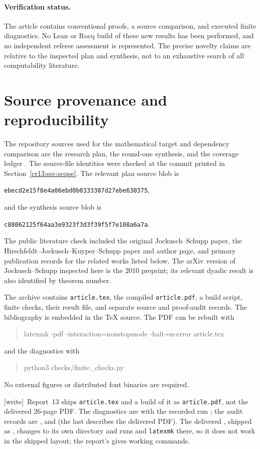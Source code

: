 \documentclass[11pt,letterpaper]{article}
\theoremstyle{definition}
\theoremstyle{remark}\newtheorem{remark}[theorem]{Remark}
\numberwithin{equation}{section}
\newcommand{\wtag}{\textup{[write]}}
\begin{document}
\paragraph{Verification status.}
The article contains conventional proofs, a source comparison, and executed finite diagnostics. No Lean or Rocq build of these new results has been performed, and no independent referee assessment is represented. The precise novelty claims are relative to the inspected plan and synthesis, not to an exhaustive search of all computability literature.

\section{Source provenance and reproducibility}\label{cr13:app:sources}
The repository sources used for the mathematical target and dependency comparison are the research plan, the round-one synthesis, and the coverage ledger \cite{Plan,Synthesis,Coverage}. The source-file identities were checked at the commit printed in Section~\ref{cr13:sec:scope}. The relevant plan source blob is
\begin{center}\small\texttt{ebecd2e15f8e4a06ebd0b0333387d27ebe630375},\end{center}
and the synthesis source blob is
\begin{center}\small\texttt{c88062125f64aa3e9323f3d3f39f5f7e108a6a7a}.\end{center}
The public literature check included the original Jockusch--Schupp paper, the Hirschfeldt--Jockusch--Kuyper--Schupp paper and author page, and primary publication records for the related works listed below. The arXiv version of Jockusch--Schupp inspected here is the 2010 preprint; its relevant dyadic result is also identified by theorem number.

The archive contains \texttt{article.tex}, the compiled \texttt{article.pdf}, a build script, finite checks, their result file, and separate source and proof-audit records. The bibliography is embedded in the TeX source. The PDF can be rebuilt with
\begin{quote}\small\ttfamily
latexmk -pdf -interaction=nonstopmode -halt-on-error article.tex
\end{quote}
and the diagnostics with
\begin{quote}\small\ttfamily
python3 checks/finite\_checks.py
\end{quote}
No external figures or distributed font binaries are required.

\noindent\wtag\ Report~13 ships \texttt{article.tex} and a build of it as \texttt{article.pdf}, not the delivered 26-page PDF. The diagnostics are  with the recorded run ; the audit records are ,  and  (the last describes the delivered PDF). The delivered , shipped as , changes to its own directory and runs  and \texttt{latexmk} there, so it does not work in the shipped layout; the report's  gives working commands.
\end{document}
